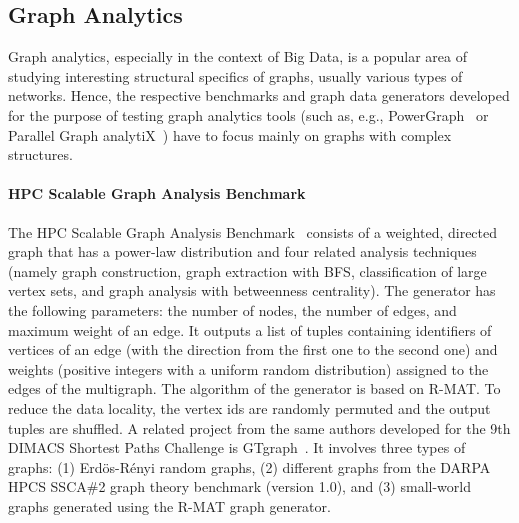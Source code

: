 \subsection{Graph Analytics}
\label{sec:generators_analytics}

Graph analytics, especially in the context of Big Data, is a popular area of studying interesting structural specifics of graphs, usually various types of networks.  Hence, the respective benchmarks and graph data generators developed for the purpose of testing graph analytics tools (such as, e.g.,  PowerGraph~\cite{Gonzalez:2012:PDG:2387880.2387883} or Parallel Graph analytiX~\cite{Sevenich:2016:UDL:3007263.3007265}) have to focus mainly on graphs with complex structures.

\paragraph{HPC Scalable Graph Analysis Benchmark} The HPC Scalable Graph
Analysis Benchmark~\cite{HPCgraph,Bader:2005:DIH:2099301.2099360} consists of a
weighted, directed graph that has a power-law distribution and four related
analysis techniques (namely graph construction, graph extraction with BFS,
                     classification of large vertex sets, and graph analysis
                     with betweenness centrality). The generator has the
following parameters: the number of nodes, the number of edges, and maximum weight of
an edge. It outputs a list of tuples containing identifiers of vertices of an
edge (with the direction from the first one to the second one) and weights
(positive integers  with a uniform random distribution) assigned to the edges of
the multigraph.  The algorithm of the generator is based on R-MAT. To reduce the data
locality, the vertex ids are randomly permuted and the output
tuples are shuffled. A related project from the same authors
developed for the 9th DIMACS Shortest Paths Challenge is GTgraph~\cite{GTgraph}.
It involves three types of graphs: (1) Erd\"{o}s-R\'{e}nyi random graphs, (2)
different graphs from the DARPA HPCS SSCA\#2 graph theory benchmark
(version 1.0), and (3) small-world graphs generated using the R-MAT graph
generator.

